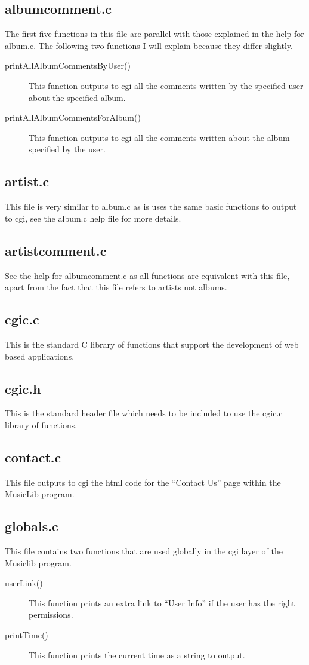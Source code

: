 \documentclass{article}
\begin{document}
\subsection{albumcomment.c}
The first five functions in this file are parallel with those explained in the help for album.c. The following two functions I will explain because they differ slightly.
\begin{description}
\item[printAllAlbumCommentsByUser()]
This function outputs to cgi all the comments written by the specified user about the specified album.
\item[printAllAlbumCommentsForAlbum()]
This function outputs to cgi all the comments written about the album specified by the user.
\end{description}

\subsection{artist.c}
This file is very similar to album.c as is uses the same basic functions to output to cgi, see the album.c help file for more details. 

\subsection{artistcomment.c}
See the help for albumcomment.c as all functions are equivalent with this file, apart from the fact that this file refers to artists not albums.

\subsection{cgic.c}
This is the standard C library of functions that support the development of web based applications.

\subsection{cgic.h}
This is the standard header file which needs to be included to use the cgic.c library of functions.

\subsection{contact.c}
This file outputs to cgi the html code for the ``Contact Us'' page within the MusicLib program.

\subsection{globals.c}
This file contains two functions that are used globally in the cgi layer of the Musiclib program. 
\begin{description}
\item[userLink()] This function prints an extra link to ``User Info'' if the user has the right permissions.
\item[printTime()] This function prints the current time as a string to output.
\end{description}
\end{document}
